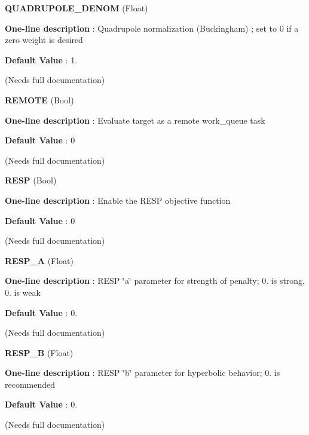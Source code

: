 \begin{DoxyItemize}
\item {\bfseries  \-Q\-U\-A\-D\-R\-U\-P\-O\-L\-E\-\_\-\-D\-E\-N\-O\-M } (\-Float) \par
{\bfseries  \-One-\/line description }\-: \-Quadrupole normalization (\-Buckingham) ; set to 0 if a zero weight is desired \par
{\bfseries  \-Default \-Value }\-: 1. \par
(\-Needs full documentation)\end{DoxyItemize}
\begin{DoxyItemize}
\item {\bfseries  \-R\-E\-M\-O\-T\-E } (\-Bool) \par
{\bfseries  \-One-\/line description }\-: \-Evaluate target as a remote work\-\_\-queue task \par
{\bfseries  \-Default \-Value }\-: 0 \par
(\-Needs full documentation)\end{DoxyItemize}
\begin{DoxyItemize}
\item {\bfseries  \-R\-E\-S\-P } (\-Bool) \par
{\bfseries  \-One-\/line description }\-: \-Enable the \-R\-E\-S\-P objective function \par
{\bfseries  \-Default \-Value }\-: 0 \par
(\-Needs full documentation)\end{DoxyItemize}
\begin{DoxyItemize}
\item {\bfseries  \-R\-E\-S\-P\-\_\-\-A } (\-Float) \par
{\bfseries  \-One-\/line description }\-: \-R\-E\-S\-P \char`\"{}a\char`\"{} parameter for strength of penalty; 0. is strong, 0. is weak \par
{\bfseries  \-Default \-Value }\-: 0. \par
(\-Needs full documentation)\end{DoxyItemize}
\begin{DoxyItemize}
\item {\bfseries  \-R\-E\-S\-P\-\_\-\-B } (\-Float) \par
{\bfseries  \-One-\/line description }\-: \-R\-E\-S\-P \char`\"{}b\char`\"{} parameter for hyperbolic behavior; 0. is recommended \par
{\bfseries  \-Default \-Value }\-: 0. \par
(\-Needs full documentation)\end{DoxyItemize}
